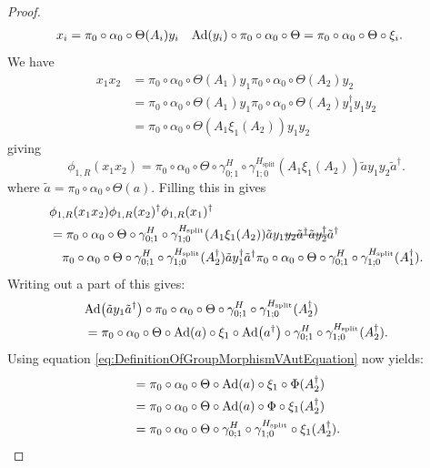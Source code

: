 \documentclass[12pt,a4paper,twoside]{article}
\numberwithin{equation}{section}
\begin{document}
\begin{proof}
	\begin{align}
		x_i&=\pi_0\circ\alpha_0\circ\Theta(A_i)y_i&\Ad{y_i}\circ\pi_0\circ\alpha_0\circ\Theta&=\pi_0\circ\alpha_0\circ\Theta\circ\xi_i.
	\end{align}
	We have
	\begin{align}
		x_1x_2&=\pi_0\circ\alpha_0\circ\Theta(A_1)y_1\pi_0\circ\alpha_0\circ\Theta(A_2)y_2\\
		&=\pi_0\circ\alpha_0\circ\Theta(A_1)y_1\pi_0\circ\alpha_0\circ\Theta(A_2)y_1^{\dagger}y_1y_2\\
		&=\pi_0\circ\alpha_0\circ\Theta(A_1\xi_1(A_2))y_1y_2
	\end{align}
	giving
	\begin{equation}
		\phi_{1,R}(x_1x_2)=\pi_0\circ\alpha_0\circ\Theta\circ\gamma^H_{0;1}\circ\gamma^{H_\text{split}}_{1;0}(A_1\xi_1(A_2))\tilde{a}y_1y_2\tilde{a}^\dagger.
	\end{equation}
	where $\tilde{a}=\pi_0\circ\alpha_0\circ\Theta(a)$. Filling this in gives
	\begin{align}
		&\phi_{1,R}(x_1x_2)\phi_{1,R}(x_2)^\dagger\phi_{1,R}(x_1)^\dagger\\
		\label{eq:HomeomorphismCondition}
		&=\pi_0\circ\alpha_0\circ\Theta\circ\gamma^H_{0;1}\circ\gamma^{H_\text{split}}_{1;0}(A_1\xi_1(A_2))\tilde{a}y_1\stkout{y_2\tilde{a}^\dagger \tilde{a}y_2^\dagger}\tilde{a}^\dagger\\
		\nonumber
		&\quad\pi_0\circ\alpha_0\circ\Theta\circ\gamma^H_{0;1}\circ\gamma^{H_\text{split}}_{1;0}(A_2^\dagger)\tilde{a}y_1^\dagger\tilde{a}^\dagger \pi_0\circ\alpha_0\circ\Theta\circ\gamma^H_{0;1}\circ\gamma^{H_\text{split}}_{1;0}(A_1^\dagger).
	\end{align}
	Writing out a part of this gives:
	\begin{align}
		&\Ad{\tilde{a}y_1\tilde{a}^\dagger}\circ\pi_0\circ\alpha_0\circ\Theta\circ\gamma^H_{0;1}\circ\gamma^{H_\text{split}}_{1;0}(A_2^\dagger)\\
		&=\pi_0\circ\alpha_0\circ\Theta\circ\Ad{a}\circ\xi_1\circ\Ad{a^\dagger}\circ\gamma^H_{0;1}\circ\gamma^{H_\text{split}}_{1;0}(A_2^\dagger).
	\end{align}
	Using equation \eqref{eq:DefinitionOfGroupMorphismVAutEquation} now yields:
	\begin{align}
		&=\pi_0\circ\alpha_0\circ\Theta\circ\Ad{a}\circ\xi_1\circ\Phi(A_2^\dagger)\\
		&=\pi_0\circ\alpha_0\circ\Theta\circ\Ad{a}\circ\Phi\circ\xi_1(A_2^\dagger)\\
		&=\pi_0\circ\alpha_0\circ\Theta\circ\gamma^H_{0;1}\circ\gamma^{H_\text{split}}_{1;0}\circ\xi_1(A_2^\dagger).

\end{align}
\end{proof}
\end{document}
